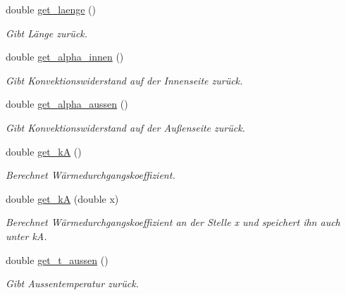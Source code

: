 \begin{DoxyCompactItemize}
\mbox{\label{class_rohr_a191d4b81fcdfc02f9433effdc1fade81}} 
double \hyperlink{class_rohr_a191d4b81fcdfc02f9433effdc1fade81}{get\+\_\+laenge} ()
\begin{DoxyCompactList}\small\item\em Gibt Länge zurück. \end{DoxyCompactList}\item 
\mbox{\label{class_rohr_a8e5ea4e3595b344475e2db45deccd9fd}} 
double \hyperlink{class_rohr_a8e5ea4e3595b344475e2db45deccd9fd}{get\+\_\+alpha\+\_\+innen} ()
\begin{DoxyCompactList}\small\item\em Gibt Konvektionswiderstand auf der Innenseite zurück. \end{DoxyCompactList}\item 
\mbox{\label{class_rohr_ad02b003b17d07ee5f53bc2defbe8227a}} 
double \hyperlink{class_rohr_ad02b003b17d07ee5f53bc2defbe8227a}{get\+\_\+alpha\+\_\+aussen} ()
\begin{DoxyCompactList}\small\item\em Gibt Konvektionswiderstand auf der Außenseite zurück. \end{DoxyCompactList}\item 
\mbox{\label{class_rohr_a29a212b5ffe5723b3c2fe02aba0804c0}} 
double \hyperlink{class_rohr_a29a212b5ffe5723b3c2fe02aba0804c0}{get\+\_\+kA} ()
\begin{DoxyCompactList}\small\item\em Berechnet Wärmedurchgangskoeffizient. \end{DoxyCompactList}\item 
double \hyperlink{class_rohr_a07985e6f4a1d9dc8bfcfe2e5cc9f2a60}{get\+\_\+kA} (double x)
\begin{DoxyCompactList}\small\item\em Berechnet Wärmedurchgangskoeffizient an der Stelle x und speichert ihn auch unter kA. \end{DoxyCompactList}\item 
\mbox{\label{class_rohr_a5d7b97148ffb9e42e5dc9b5657a64cc0}} 
double \hyperlink{class_rohr_a5d7b97148ffb9e42e5dc9b5657a64cc0}{get\+\_\+t\+\_\+aussen} ()
\begin{DoxyCompactList}\small\item\em Gibt Aussentemperatur zurück. \end{DoxyCompactList}\item 

\end{DoxyCompactItemize}

